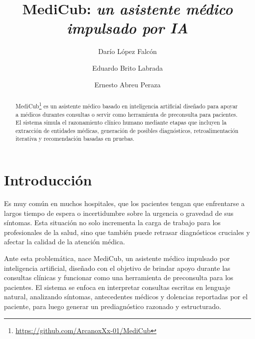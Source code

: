 \documentclass{llncs}
\begin{document}
\mainmatter

\title{ MediCub: \textit{un asistente médico impulsado por IA} }

\author{Darío López Falcón \and Eduardo Brito Labrada \and Ernesto Abreu Peraza}


\maketitle

\begin{abstract}

MediCub\footnote{\url{https://github.com/ArcanoxXx-01/MediCub}} es un asistente médico basado en inteligencia artificial diseñado para apoyar a médicos durantes consultas o servir
como herramienta de preconsulta para pacientes. El sistema simula el razonamiento clínico humano mediante etapas que incluyen
la extracción de entidades médicas, generación de posibles diagnósticos, retroalimentación iterativa y recomendación basadas en
pruebas.
\end{abstract}

\section{Introducción}

Es muy común en muchos hospitales, que los pacientes tengan que enfrentarse a largos tiempo de espera o incertidumbre sobre la urgencia o gravedad de sus síntomas. Esta
situación no solo incrementa la carga de trabajo para los profesionales de la salud, sino que también puede retrasar diagnósticos cruciales y afectar la calidad de la atención
médica.

Ante esta problemática, nace MediCub, un asistente médico impulsado por inteligencia artificial, diseñado con el objetivo de brindar apoyo durante las consultas clínicas y 
funcionar como una herramienta de preconsulta para los pacientes. El sistema se enfoca en interpretar consultas escritas en lenguaje natural, analizando síntomas, antecedentes 
médicos y dolencias reportadas por el paciente, para luego generar un prediagnóstico razonado y estructurado.
\end{document}

